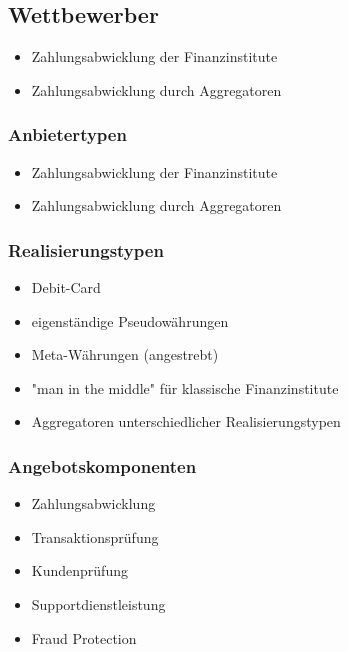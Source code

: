 \subsection{Wettbewerber}

\begin{itemize}
 \item Zahlungsabwicklung der Finanzinstitute
 \item Zahlungsabwicklung durch Aggregatoren
\end{itemize}


\subsubsection{Anbietertypen}

\begin{itemize}
 \item Zahlungsabwicklung der Finanzinstitute
 \item Zahlungsabwicklung durch Aggregatoren
\end{itemize}
 

\subsubsection{Realisierungstypen}

\begin{itemize}
 \item Debit-Card
 \item eigenständige Pseudowährungen
 \item Meta-Währungen (angestrebt)
 \item "man in the middle" für klassische Finanzinstitute
 \item Aggregatoren unterschiedlicher Realisierungstypen
\end{itemize}


\subsubsection{Angebotskomponenten}

\begin{itemize}
 \item Zahlungsabwicklung
 \item Transaktionsprüfung
 \item Kundenprüfung
 \item Supportdienstleistung
 \item Fraud Protection
\end{itemize}

